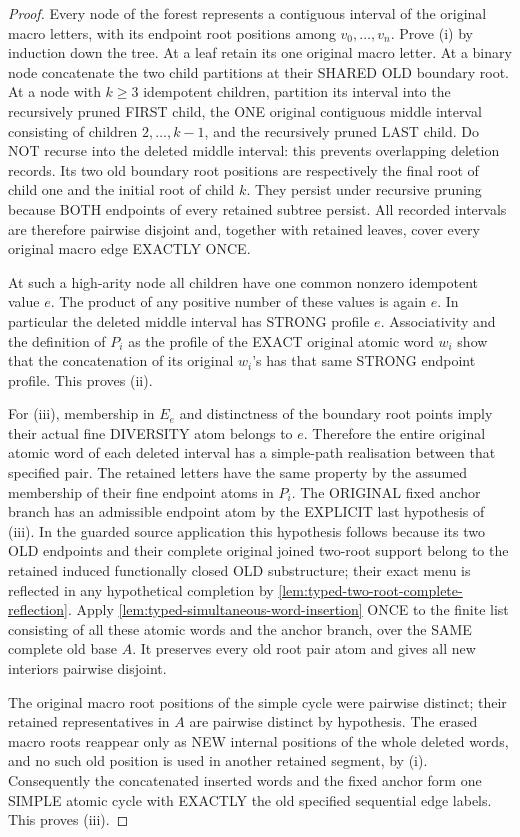 \begin{proof}
Every node of the forest
represents a contiguous interval
of the original macro letters,
with its endpoint root positions
among \(v_0,\ldots,v_n\).
Prove (i) by induction down the
tree. At a leaf retain its one
original macro letter. At a
binary node concatenate the two
child partitions at their SHARED
OLD boundary root. At a node
with \(k\ge3\) idempotent
children, partition its interval
into the recursively pruned
FIRST child, the ONE original
contiguous middle interval
consisting of children
\(2,\ldots,k-1\), and the
recursively pruned LAST child.
Do NOT recurse into the deleted
middle interval: this prevents
overlapping deletion records.
Its two old boundary root
positions are respectively
the final root of child one
and the initial root of child
\(k\). They persist under
recursive pruning because
BOTH endpoints of every
retained subtree persist.
All recorded intervals are
therefore pairwise disjoint
and, together with retained
leaves, cover every original
macro edge EXACTLY ONCE.

At such a high-arity node all
children have one common nonzero
idempotent value \(e\).
The product of any positive
number of these values is
again \(e\). In particular
the deleted middle interval
has STRONG profile \(e\).
Associativity and the
definition of \(P_i\) as the
profile of the EXACT original
atomic word \(w_i\) show that
the concatenation of its
original \(w_i\)'s has that
same STRONG endpoint profile.
This proves (ii).

For (iii), membership in
\(E_e\) and distinctness
of the boundary root points
imply their actual fine
DIVERSITY atom belongs to
\(e\). Therefore the entire
original atomic word of
each deleted interval has
a simple-path realisation
between that specified
pair. The retained letters
have the same property by
the assumed membership of
their fine endpoint atoms
in \(P_i\). The ORIGINAL fixed anchor
branch has an admissible
endpoint atom by the
EXPLICIT last hypothesis
of (iii). In the guarded
source application this
hypothesis follows because
its two OLD endpoints and
their complete original
joined two-root support
belong to the retained
induced functionally
closed OLD substructure;
their exact menu is
reflected in any
hypothetical completion
by
\cref{lem:typed-two-root-complete-reflection}.
Apply
\cref{lem:typed-simultaneous-word-insertion}
ONCE to the finite list
consisting of all these
atomic words and the
anchor branch, over the
SAME complete old base
\(A\). It preserves every
old root pair atom and
gives all new interiors
pairwise disjoint.

The original macro root
positions of the simple
cycle were pairwise
distinct; their retained
representatives in \(A\)
are pairwise distinct by
hypothesis. The erased
macro roots reappear only
as NEW internal positions
of the whole deleted words,
and no such old position is
used in another retained
segment, by (i).
Consequently the
concatenated inserted words
and the fixed anchor form
one SIMPLE atomic cycle
with EXACTLY the old
specified sequential edge
labels. This proves (iii).
\end{proof}

